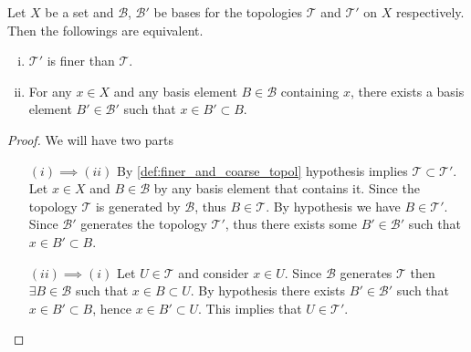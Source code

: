 \begin{proposition}
	Let $ X $ be a set and $ \mathcal{B} $, $ \mathcal{B}' $ be bases for the topologies $ \mathcal{T} $ and $ \mathcal{T}' $ on $ X $ respectively. Then the followings are equivalent.
	\begin{enumerate}[(i)]
		\item $ \mathcal{T}'$ is finer than $ \mathcal{T} $.
		\item For any $ x\in X $ and any basis element $ B \in \mathcal{B} $ containing $ x $, there exists a basis element $ B' \in \mathcal{B}' $ such that  $ x\in B' \subset B $.
	\end{enumerate}
\end{proposition}
\begin{proof}
	We will have two parts
	\begin{itemize}
		\item [$\boxed{(i) \implies (ii)}$] By \autoref{def:finer_and_coarse_topol} hypothesis implies $ \mathcal{T} \subset \mathcal{T}' $. Let $ x \in X $ and $ B \in \mathcal{B} $ by any basis element that contains it. Since the topology $ \mathcal{T} $ is generated by $ \mathcal{B} $, thus $ B \in \mathcal{T} $. By hypothesis we have $ B \in \mathcal{T}' $. Since $ \mathcal{B}' $ generates the topology $ \mathcal{T}' $, thus there exists some $ B' \in \mathcal{B}' $ such that $ x \in B' \subset B $.
		\item [$\boxed{(ii) \implies (i)}$] Let $ U \in \mathcal{T} $ and consider $ x \in U $. Since $ \mathcal{B} $ generates $ \mathcal{T} $ then $ \exists B \in \mathcal{B} $ such that $ x \in B \subset U $. By hypothesis there exists $ B' \in \mathcal{B}' $ such that $ x \in B' \subset B $, hence $ x \in B' \subset U $. This implies that $ U \in \mathcal{T}' $.
	\end{itemize}
\end{proof}


